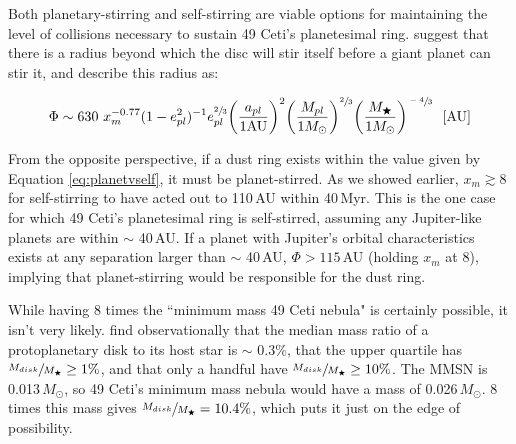 





Both planetary-stirring and self-stirring are viable options for maintaining the level of collisions necessary to sustain 49 Ceti's planetesimal ring. \cite{Must09} suggest that there is a radius beyond which the disc will stir itself before a giant planet can stir it, and describe this radius as:

\begin{equation}
\label{eq:planetvself}
\Phi \sim 630~x_{m}^{-0.77} (1-e_{pl}^{2})^{-1}e_{pl}^{\sfrac{2}{3}}\bigg(\frac{a_{pl}}{1\text{AU}}\bigg)^{2}  \bigg(\frac{M_{pl}}{1M_{\odot}}\bigg)^{\sfrac{2}{3}} \bigg(\frac{M_{\bigstar}}{1M_{\odot}}\bigg)^{\sfrac{-4}{3}}~~[\text{AU}]
\end{equation}

From the opposite perspective, if a dust ring exists within the value given by Equation \ref{eq:planetvself}, it must be planet-stirred. As we showed earlier, $x_{m} \gtrsim 8$ for self-stirring to have acted out to 110\,AU within 40\,Myr. This is the one case for which 49 Ceti's planetesimal ring is self-stirred, assuming any Jupiter-like planets are within $\sim$ 40\,AU. If a planet with Jupiter's orbital characteristics exists at any separation larger than $\sim$ 40\,AU, $\Phi > 115$\,AU (holding $x_{m}$ at 8), implying that planet-stirring would be responsible for the dust ring. 

While having 8 times the ``minimum mass 49 Ceti nebula" is certainly possible, it isn't very likely. \cite{Andr13} find observationally that the median mass ratio of a protoplanetary disk to its host star is $\sim$ 0.3$\%$, that the upper quartile has $\sfrac{M_{disk}}{M_{\bigstar}} \geq 1\%$, and that only a handful have $\sfrac{M_{disk}}{M_{\bigstar}} \geq 10\%$. The MMSN is 0.013\,$M_{\odot}$\citep{Desc07}, so 49 Ceti's minimum mass nebula would have a mass of 0.026\,$M_{\odot}$. 8 times this mass gives $\sfrac{M_{disk}}{M_{\bigstar}} = 10.4\%$, which puts it just on the edge of possibility. 

